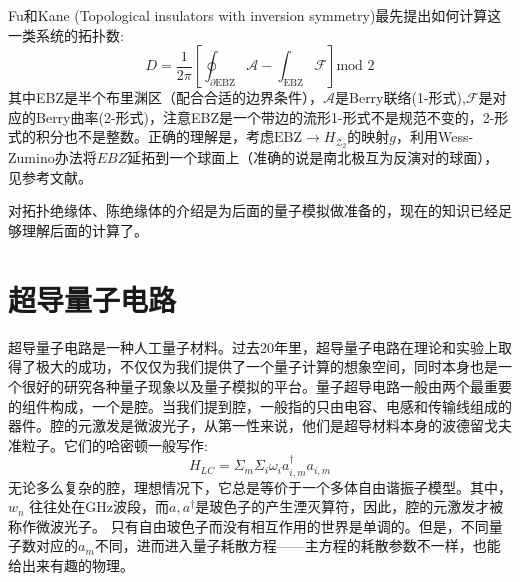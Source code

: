 \documentclass[supercite]{HustGraduPaper}
\begin{document}
Fu和Kane (Topological insulators with inversion symmetry)最先提出如何计算这一类系统的拓扑数:
\begin{equation}
D = \frac{1}{2\pi} [\oint_{\partial \text{EBZ}} \mathcal{A} - \int_{\text{EBZ}} \mathcal{F} ] \text{mod } 2
\end{equation}
其中EBZ是半个布里渊区（配合合适的边界条件），$\mathcal{A}$是Berry联络(1-形式),$\mathcal{F}$是对应的Berry曲率(2-形式)，注意EBZ是一个带边的流形1-形式不是规范不变的，2-形式的积分也不是整数。正确的理解是，考虑$\text{EBZ} \to H_{\mathcal{Z}_2}$的映射$g$，利用Wess-Zumino办法将$EBZ$延拓到一个球面上（准确的说是南北极互为反演对的球面），见参考文献\cite{fukui2008topological,moore2007topological}。

对拓扑绝缘体、陈绝缘体的介绍是为后面的量子模拟做准备的，现在的知识已经足够理解后面的计算了。

	\newpage
   \section{超导量子电路}
   超导量子电路是一种人工量子材料。\cite{you2003quantum,GU20171}过去20年里，超导量子电路在理论和实验上取得了极大的成功，不仅仅为我们提供了一个量子计算的想象空间，同时本身也是一个很好的研究各种量子现象以及量子模拟的平台。量子超导电路一般由两个最重要的组件构成，一个是腔。当我们提到腔，一般指的只由电容、电感和传输线组成的器件。腔的元激发是微波光子\cite{haroche2006exploring,GU20171}，从第一性来说，他们是超导材料本身的波德留戈夫准粒子。它们的哈密顿一般写作\cite{GU20171,you2003quantum}:
   \begin{equation}
   H_{LC} = \Sigma_m \Sigma_i \omega_{i} a^\dagger_{i,m} a_{i,m}
   \end{equation}
   无论多么复杂的腔，理想情况下，它总是等价于一个多体自由谐振子模型。其中，$w_{n}$ 往往处在GHz波段，而$a, a^\dagger$是玻色子的产生湮灭算符，因此，腔的元激发才被称作微波光子。 只有自由玻色子而没有相互作用的世界是单调的。但是，不同量子数对应的$a_m$不同，进而进入量子耗散方程——主方程的耗散参数不一样，也能给出来有趣的物理。
   
\end{document}
